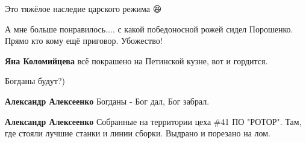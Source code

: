 \begin{itemize}
 
Это тяжёлое наследие царского режима 😆

 
А мне больше понравилось.... с какой победоносной рожей сидел Порошенко. Прямо кто кому ещё приговор. Убожество!

\begin{itemize}
 
\textbf{Яна Коломийцева} всё покрашено на Петинской кузне, вот и гордится.
\end{itemize}

 
Богданы будут?)

\begin{itemize}
 
\textbf{Александр Алексеенко} Богданы - Бог дал, Бог забрал.

 
\textbf{Александр Алексеенко}
Собранные на территории цеха \#41 ПО "РОТОР". Там, где стояли лучшие станки и линии сборки. Выдрано и порезано на лом.
\end{itemize}


\end{itemize}
